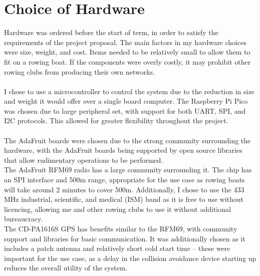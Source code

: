 \documentclass[12pt,a4paper]{report}
\begin{document}
\section{Choice of Hardware} 
Hardware was ordered before the start of term, in order to satisfy the requirements of the project proposal. The main factors in my hardware choices were size, weight, and cost. Items needed to be relatively small to allow them to fit on a rowing boat. If the components were overly costly, it may prohibit other rowing clubs from producing their own networks. \\ \\
I chose to use a microcontroller to control the system due to the reduction in size and weight it would offer over a single board computer. The Raspberry Pi Pico was chosen due to large peripheral set, with support for both UART, SPI, and I2C protocols. This allowed for greater flexibility throughout the project. \\ \\
The AdaFruit boards were chosen due to the strong community surrounding the hardware, with the AdaFruit boards being supported by open source libraries that allow rudimentary operations to be performed. \\
The AdaFruit RFM69 radio has a large community surrounding it. The chip has an SPI interface and 500m range, appropriate for the use case as rowing boats will take around 2 minutes to cover 500m. Additionally, I chose to use the 433 MHz industrial, scientific, and medical (ISM) band as it is free to use without licencing, allowing me and other rowing clubs to use it without additional bureaucracy. \\
The CD-PA1616S GPS has benefits similar to the RFM69, with community support and libraries for basic communication. It was additionally chosen as it includes a patch antenna and relatively short cold start time -- these were important for the use case, as a delay in the collision avoidance device starting up reduces the overall utility of the system.
\end{document}
